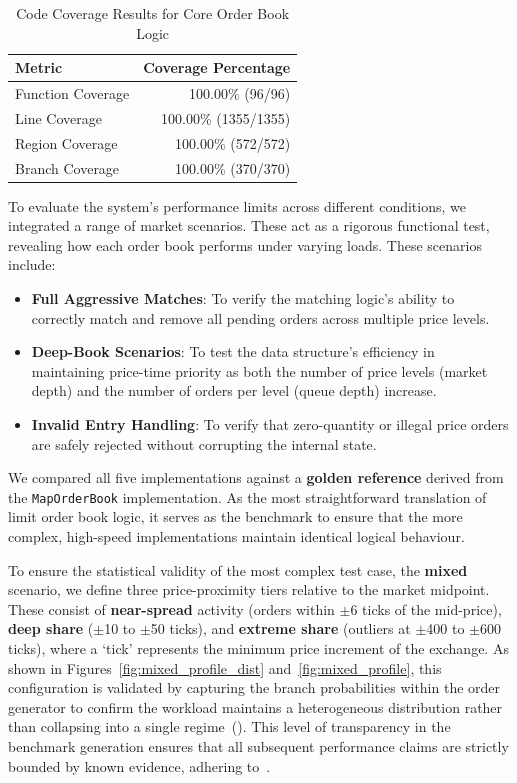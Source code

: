 \begin{table}[htbp]
    \centering
    \small
    \begin{tabular}{lr}
        \toprule
        \textbf{Metric} & \textbf{Coverage Percentage} \\
        \midrule
        Function Coverage & 100.00\% (96/96) \\
        Line Coverage     & 100.00\% (1355/1355) \\
        Region Coverage   & 100.00\% (572/572) \\
        Branch Coverage   & 100.00\% (370/370) \\
        \bottomrule
    \end{tabular}
    \caption{Code Coverage Results for Core Order Book Logic}
    \label{tab:code_coverage_results}
\end{table}


To evaluate the system's performance limits across different conditions, we integrated 
a range of market scenarios. These act as a rigorous functional test, revealing 
how each order book performs under varying loads. These scenarios include: 
\begin{itemize}
    \item \textbf{Full Aggressive Matches}: To verify the matching logic's ability 
    to correctly match and remove all pending orders across multiple price levels.
    \item \textbf{Deep-Book Scenarios}: To test the data structure's efficiency in 
    maintaining price-time priority as both the number of price levels (market 
    depth) and the number of orders per level (queue depth) increase.
    \item \textbf{Invalid Entry Handling}: To verify that zero-quantity or illegal 
    price orders are safely rejected without corrupting the internal state.
\end{itemize}
We compared all five implementations against a \textbf{golden reference} derived 
from the \texttt{MapOrderBook} implementation. As the most straightforward translation of 
limit order book logic, it serves as the benchmark to ensure that 
the more complex, high-speed implementations maintain identical logical behaviour. 

To ensure the statistical validity of the most complex test case, the 
\textbf{mixed} scenario, we define three price-proximity tiers relative to the 
market midpoint. These consist of \textbf{near-spread} activity (orders within 
$\pm$6 ticks of the mid-price), \textbf{deep share} ($\pm$10 to $\pm$50 ticks), 
and \textbf{extreme share} (outliers at $\pm$400 to $\pm$600 ticks), where a 
`tick' represents the minimum price increment of the exchange. As shown in 
Figures~\ref{fig:mixed_profile_dist} and~\ref{fig:mixed_profile}, this configuration is validated by capturing the 
branch probabilities within the order generator to confirm the workload 
maintains a heterogeneous distribution rather than collapsing into a single 
regime~(). This level of transparency in the benchmark generation ensures 
that all subsequent performance claims are strictly bounded by known evidence, 
adhering to~.

